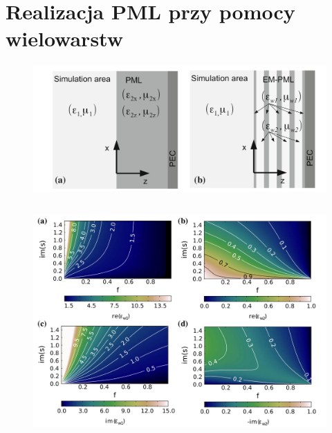 \documentclass{beamer}
\begin{document}
\section{Realizacja PML przy pomocy wielowarstw}
\begin{frame}
	\begin{figure}
				\includegraphics[width=\textwidth]{../images/pml/oqe_schemat.png}
			\end{figure}

	\begin{columns}
		\begin{column}{0.5\textwidth}

		\end{column}
		\begin{column}{0.5\textwidth}

		\end{column}
	\end{columns}
	\cite{ania2015}	
\end{frame}

\begin{frame}
	\begin{figure}
				\includegraphics[width=\textwidth]{../images/pml/oqe_materials.png}
	\end{figure}
		
\end{frame}
\end{document}
